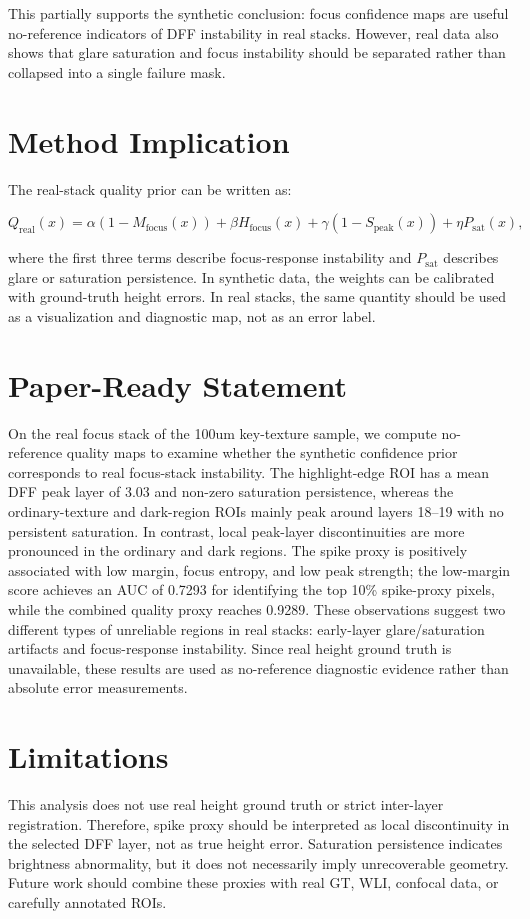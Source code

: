 \documentclass[11pt]{article}
\begin{document}
This partially supports the synthetic conclusion: focus confidence maps are useful no-reference indicators of DFF instability in real stacks. However, real data also shows that glare saturation and focus instability should be separated rather than collapsed into a single failure mask.

\section{Method Implication}

The real-stack quality prior can be written as:

\begin{equation}
Q_{\mathrm{real}}(x) =
\alpha (1 - M_{\mathrm{focus}}(x))
+ \beta H_{\mathrm{focus}}(x)
+ \gamma (1 - S_{\mathrm{peak}}(x))
+ \eta P_{\mathrm{sat}}(x),
\end{equation}

where the first three terms describe focus-response instability and $P_{\mathrm{sat}}$ describes glare or saturation persistence. In synthetic data, the weights can be calibrated with ground-truth height errors. In real stacks, the same quantity should be used as a visualization and diagnostic map, not as an error label.

\section{Paper-Ready Statement}

On the real focus stack of the 100um key-texture sample, we compute no-reference quality maps to examine whether the synthetic confidence prior corresponds to real focus-stack instability. The highlight-edge ROI has a mean DFF peak layer of 3.03 and non-zero saturation persistence, whereas the ordinary-texture and dark-region ROIs mainly peak around layers 18--19 with no persistent saturation. In contrast, local peak-layer discontinuities are more pronounced in the ordinary and dark regions. The spike proxy is positively associated with low margin, focus entropy, and low peak strength; the low-margin score achieves an AUC of 0.7293 for identifying the top 10\% spike-proxy pixels, while the combined quality proxy reaches 0.9289. These observations suggest two different types of unreliable regions in real stacks: early-layer glare/saturation artifacts and focus-response instability. Since real height ground truth is unavailable, these results are used as no-reference diagnostic evidence rather than absolute error measurements.

\section{Limitations}

This analysis does not use real height ground truth or strict inter-layer registration. Therefore, spike proxy should be interpreted as local discontinuity in the selected DFF layer, not as true height error. Saturation persistence indicates brightness abnormality, but it does not necessarily imply unrecoverable geometry. Future work should combine these proxies with real GT, WLI, confocal data, or carefully annotated ROIs.
\end{document}
